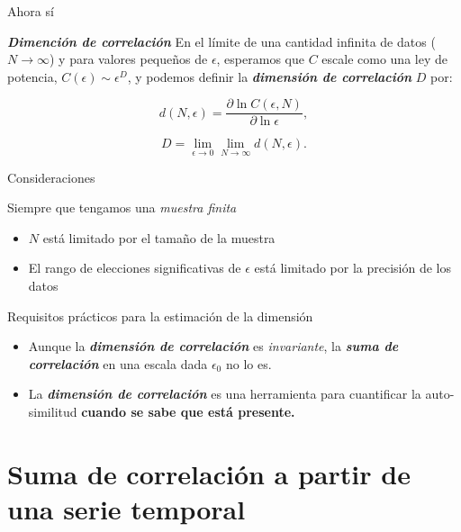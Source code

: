 \documentclass[11pt]{beamer}
\begin{document}
\begin{frame}{Ahora sí}
\begin{block}{\textit{\textbf{Dimención de correlación}}}
En el límite de una cantidad infinita de datos (\(N \rightarrow \infty\)) y para valores pequeños de \(\epsilon\), esperamos que \(C\) escale como una ley de potencia, \(C(\epsilon) \sim \epsilon^D\), y podemos definir la \textbf{\textit{dimensión de correlación}} \(D\) por:

\begin{equation}
d(N, \epsilon) = \frac{\partial \ln C(\epsilon, N)}{\partial \ln \epsilon}, 
\end{equation}

\begin{equation}
D = \lim_{\epsilon \to 0} \lim_{N \to \infty} d(N, \epsilon).
\end{equation}
\end{block}

\end{frame}

\begin{frame}{Consideraciones}
\begin{block}{Siempre que tengamos una \textit{muestra finita}}
\begin{itemize}
	\item \(N\) está limitado por el tamaño de la muestra
	\item El rango de elecciones significativas de \(\epsilon\) está limitado por la precisión de los datos
\end{itemize}
\end{block}
\begin{block}{Requisitos prácticos para la estimación de la dimensión}
\begin{itemize}
\item Aunque la \textbf{\textit{dimensión de correlación}} es \textit{invariante}, la \textbf{\textit{suma de correlación}} en una escala dada \(\epsilon_0\) no lo es.
\item La \textit{\textbf{dimensión de correlación}} es una herramienta para cuantificar la auto-similitud\textbf{ cuando se sabe que está presente.}
\end{itemize}
\end{block}
\end{frame}

\section{Suma de correlación a partir de una serie temporal}
\begin{frame} 
\tableofcontents[currentsection] %
\end{frame}
\end{document}
